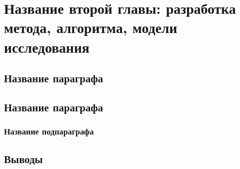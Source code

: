\chapter{Название второй главы: разработка метода, алгоритма, модели исследования} \label{ch2}
	



\section{Название параграфа} \label{ch2:title-abbr} %


	
\section{Название параграфа} \label{ch2:sec-abbr} %
	

\subsection{Название подпараграфа} \label{ch2:subsec-title-abbr} %



\section{Выводы} \label{ch2:conclusion}



